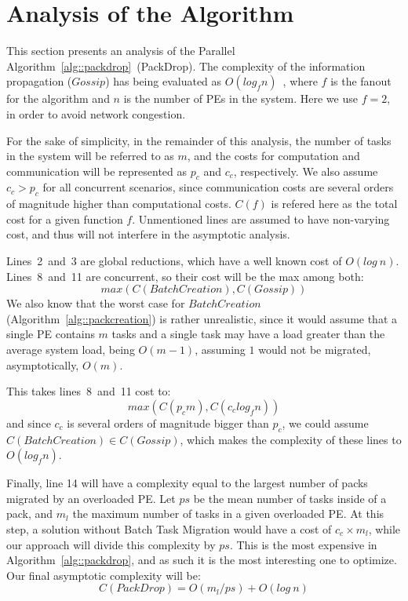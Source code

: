\section{Analysis of the Algorithm} \label{sec:analysis}

This section presents an analysis of the Parallel Algorithm~\ref{alg::packdrop}~(PackDrop). 
The complexity of the information propagation ($Gossip$) has being evaluated as $O(log_fn)$~\cite{grapevine},
where $f$ is the fanout for the algorithm and $n$ is the number of PEs in the system.
Here we use $f=2$, in order to avoid network congestion. 

For the sake of simplicity, in the remainder of this analysis, the number of tasks in the system
will be referred to as $m$, and the costs for computation and communication will be represented as $p_c$ and $c_c$, respectively.
We also assume $c_c > p_c$ for all concurrent scenarios, since communication costs are several orders of magnitude higher than computational costs.
$C(f)$ is refered here as the total cost for a given function $f$.
Unmentioned lines are assumed to have non-varying cost, and thus will not interfere in the asymptotic analysis.

Lines~2~and~3 are global reductions, which have a well known cost of $O(log\ n)$.
Lines~8~and~11 are concurrent, so their cost will be the max among both:
\begin{equation}
  max(C(BatchCreation),C(Gossip))
\end{equation}
We also know that the worst case for $BatchCreation$ (Algorithm~\ref{alg::packcreation}) is rather unrealistic, 
since it would assume that a single PE contains $m$ tasks and a single task may have a load greater than the average system load, being $O(m-1)$, assuming $1$ would not be migrated, asymptotically, $O(m)$.

This takes lines~8~and~11 cost to:
\begin{equation}
 max(C(p_cm),C(c_clog_fn))
\end{equation}
and since $c_c$ is several orders of magnitude bigger than $p_c$, we could assume $C(BatchCreation)\in C(Gossip)$, which makes the 
complexity of these lines to $O(log_fn)$.

Finally, line 14 will have a complexity equal to the largest number of packs migrated by an overloaded PE.
Let $ps$ be the mean number of tasks inside of a pack, and $m_l$ the maximum number of tasks in a given overloaded PE.
At this step, a solution without Batch Task Migration would have a cost of $c_c\times m_l$, while our approach will divide this complexity by $ps$. 
This is the most expensive in Algorithm~\ref{alg::packdrop}, and as such it is the most interesting one to optimize.
Our final asymptotic complexity will be:
\begin{equation}
 C(PackDrop) = O(m_l/ps) + O(log\ n)
 \label{eq:worstcase}
\end{equation}

